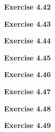 \documentclass{article}
\begin{document}
\bigskip

\begin{framed}
    \noindent \textbf{Exercise 4.42}
    
    \medskip
    
    
\end{framed}


\bigskip

\begin{framed}
    \noindent \textbf{Exercise 4.43}
    
    \medskip
    
    
\end{framed}


\bigskip

\begin{framed}
    \noindent \textbf{Exercise 4.44}
    
    \medskip
    
    
\end{framed}


\bigskip

\begin{framed}
    \noindent \textbf{Exercise 4.45}
    
    \medskip
    
    
\end{framed}


\bigskip

\begin{framed}
    \noindent \textbf{Exercise 4.46}
    
    \medskip
    
    
\end{framed}


\bigskip

\begin{framed}
    \noindent \textbf{Exercise 4.47}
    
    \medskip
    
    
\end{framed}


\bigskip

\begin{framed}
    \noindent \textbf{Exercise 4.48}
    
    \medskip
    
    
\end{framed}


\bigskip

\begin{framed}
    \noindent \textbf{Exercise 4.49}
    
    \medskip
    
    
\end{framed}
\end{document}
